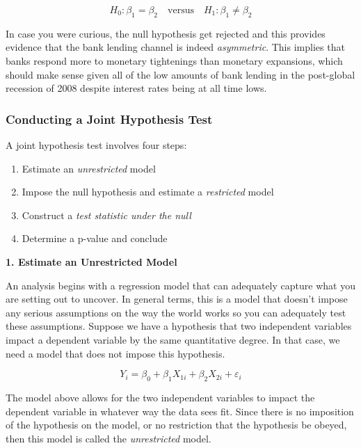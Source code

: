 \documentclass[
]{book}
\begin{document}
\[H_0: \beta_1=\beta_2 \quad \text{versus} \quad H_1: \beta_1 \neq \beta_2\]

In case you were curious, the null hypothesis get rejected and this provides evidence that the bank lending channel is indeed \emph{asymmetric}. This implies that banks respond more to monetary tightenings than monetary expansions, which should make sense given all of the low amounts of bank lending in the post-global recession of 2008 despite interest rates being at all time lows.

\hypertarget{conducting-a-joint-hypothesis-test}{%
\subsubsection*{Conducting a Joint Hypothesis Test}\label{conducting-a-joint-hypothesis-test}}

A joint hypothesis test involves four steps:

\begin{enumerate}
\def\labelenumi{\arabic{enumi}.}
\item
  Estimate an \emph{unrestricted} model
\item
  Impose the null hypothesis and estimate a \emph{restricted} model
\item
  Construct a \emph{test statistic under the null}
\item
  Determine a p-value and conclude
\end{enumerate}

\textbf{1. Estimate an Unrestricted Model}

An analysis begins with a regression model that can adequately capture what you are setting out to uncover. In general terms, this is a model that doesn't impose any serious assumptions on the way the world works so you can adequately test these assumptions. Suppose we have a hypothesis that two independent variables impact a dependent variable by the same quantitative degree. In that case, we need a model that does not impose this hypothesis.

\[Y_i = \beta_0 + \beta_1 X_{1i} + \beta_2 X_{2i} + \varepsilon_i\]

The model above allows for the two independent variables to impact the dependent variable in whatever way the data sees fit. Since there is no imposition of the hypothesis on the model, or no restriction that the hypothesis be obeyed, then this model is called the \emph{unrestricted} model.
\end{document}
